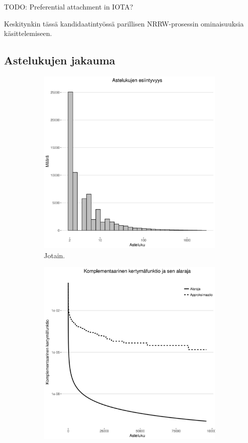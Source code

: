 \documentclass[finnish, 12pt, a4paper, sci, utf8, pdfa]{aaltothesis}
\begin{document}
TODO: Preferential attachment in IOTA?

Keskitynkin tässä kandidaatintyössä parillisen NRRW-prosessin ominaisuuksia käsittelemiseen.

\subsection{Astelukujen jakauma}

\begin{figure}[htb]
\centering
   \begin{subfigure}[b]{0.47\textwidth}
      \includegraphics[width=\textwidth]{pictures/approx_hist.jpg}
      \caption{Jotain. \label{figure:approx_hist}}
   \end{subfigure}
   \quad
   \begin{subfigure}[b]{0.47\textwidth}
      \includegraphics[width=\textwidth]{pictures/approx_cdf.jpg}

\end{subfigure}
\end{figure}
\end{document}
